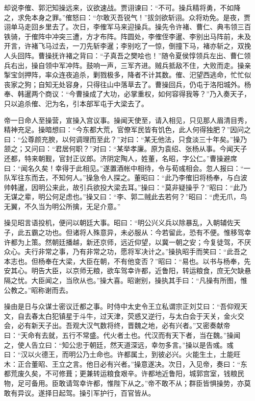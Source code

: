 却说李傕、郭汜知操远来，议欲速战。贾诩谏曰：“不可。操兵精将勇，不如降之，求免本身之罪。”傕怒曰：“尔敢灭吾锐气！”拔剑欲斩诩。众将劝免。是夜，贾诩单马走回乡里去了。次日，李傕军马来迎操兵。操先令许褚、曹仁、典韦领三百铁骑，于傕阵中冲突三遭，方才布阵。阵圆处，李傕侄李暹、李别出马阵前，未及开言，许褚飞马过去，一刀先斩李暹；李别吃了一惊，倒撞下马，褚亦斩之，双挽人头回阵。曹操抚许褚之背曰：“子真吾之樊哙也！”随令夏侯惇领兵左出、曹仁领兵右出，操自领中军冲阵。鼓响一声，三军齐进。贼兵抵敌不住，大败而走。操亲掣宝剑押阵，率众连夜追杀，剿戮极多，降者不计其数。傕、汜望西逃命，忙忙似丧家之狗；自知无处容身，只得往山中落草去了。曹操回兵，仍屯于洛阳城外。杨奉、韩暹两个商议：“今曹操成了大功，必掌重权，如何容得我等？”乃入奏天子，只以追杀傕、汜为名，引本部军屯于大梁去了。

帝一日命人至操营，宣操入宫议事。操闻天使至，请入相见，只见那人眉清目秀，精神充足。操暗想曰：“今东都大荒，官僚军民皆有饥色，此人何得独肥？”因问之曰：“公尊颜充腴，以何调理而至此？”对曰：“某无他法，只食淡三十年矣。”操乃颔之；又问曰：“君居何职？”对曰：“某举孝廉。原为袁绍、张杨从事。今闻天子还都，特来朝觐，官封正议郎。济阴定陶人，姓董，名昭，字公仁。”曹操避席曰：“闻名久矣！幸得于此相见。”遂置酒帐中相待，令与荀彧相会。忽人报曰：“一队军往东而去，不知何人。”操急令人探之。董昭曰：“此乃李傕旧将杨奉，与白波帅韩暹，因明公来此，故引兵欲投大梁去耳。”操曰：“莫非疑操乎？”昭曰：“此乃无谋之辈，明公何足虑也。”操又曰：“李、郭二贼此去若何？”昭曰：“虎无爪，鸟无翼，不久当为明公所擒，无足介意。”

操见昭言语投机，便问以朝廷大事。昭曰：“明公兴义兵以除暴乱，入朝辅佐天子，此五霸之功也。但诸将人殊意异，未必服从：今若留此，恐有不便。惟移驾幸许都为上策。然朝廷播越，新还京师，远近仰望，以冀一朝之安；今复徒驾，不厌众心。夫行非常之事，乃有非常之功，愿将军决计之。”操执昭手而笑曰：“此吾之本志也。但杨奉在大梁，大臣在朝，不有他变否？”昭曰：“易也。以书与杨奉，先安其心。明告大臣，以京师无粮，欲车驾幸许都，近鲁阳，转运粮食，庶无欠缺悬隔之忧。大臣闻之，当欣从也。”操大喜。昭谢别，操执其手曰：“凡操有所图，惟公教之。”昭称谢而去。

操由是日与众谋士密议迁都之事。时侍中太史令王立私谓宗正刘艾曰：“吾仰观天文，自去春太白犯镇星于斗牛，过天津，荧惑又逆行，与太白会于天关，金火交会，必有新天子出。吾观大汉气数将终，晋魏之地，必有兴者。”又密奏献帝曰：“天命有去就，五行不常盛。代火者土也。代汉而有天下者，当在魏。”操闻之，使人告立曰：“知公忠于朝廷，然天道深远，幸勿多言。”操以是告彧。彧曰：“汉以火德王，而明公乃土命也。许都属土，到彼必兴。火能生土，土能旺木：正合董昭、王立之言。他日必有兴者。”操意遂决。次日，入见帝，奏曰：“东都荒废久矣，不可修葺；更兼转运粮食艰辛。许都地近鲁阳，城郭宫室，钱粮民物，足可备用。臣敢请驾幸许都，惟陛下从之。”帝不敢不从；群臣皆惧操势，亦莫敢有异议。遂择日起驾。操引军护行，百官皆从。

